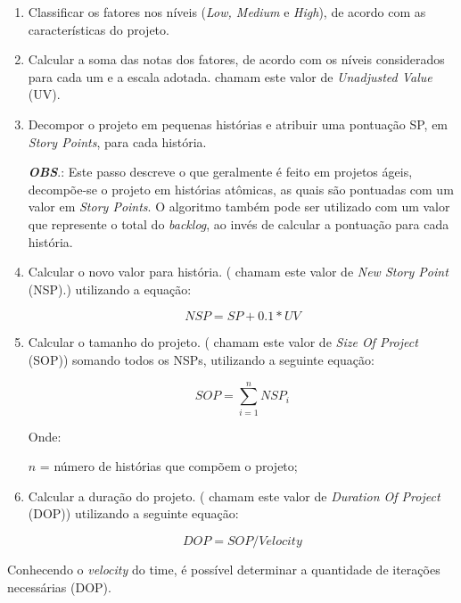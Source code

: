     \begin{enumerate}
     
     \item Classificar os fatores nos níveis (\textit{Low, Medium} e \textit{High}), de acordo com as características do projeto.
     
     \item Calcular a soma das notas dos fatores, de acordo com os níveis considerados para cada um e a escala adotada.
	    chamam este valor de \textit{Unadjusted Value} (UV).
	   
     \item Decompor o projeto em pequenas histórias e atribuir uma pontuação SP, em \textit{Story Points}, para cada história.
	
	\subitem \textbf{\textit{OBS}}.: Este passo descreve o que geralmente é feito em projetos ágeis, decompõe-se o projeto
		  em histórias atômicas, as quais são pontuadas com um valor em \textit{Story Points}.
		  O algoritmo também pode ser utilizado com um valor que represente o total do \textit{backlog}, ao invés de 
		  calcular a pontuação para cada história.
     
     \item Calcular o novo valor para história. 
	   ( chamam este valor de \textit{New Story Point} (NSP).) utilizando a equação:
     
	    $$ NSP = SP + 0.1*UV $$
	    
     \item Calcular o tamanho do projeto. ( chamam este valor de \textit{Size Of Project} (SOP))
	   somando todos os NSPs, utilizando a seguinte equação:
     
	    $$ SOP = \sum\limits_{i=1}^{n}NSP_i $$
	    
	    Onde:
	    
	    $n$ = número de histórias que compõem o projeto;
	    
     \item Calcular a duração do projeto. ( chamam este valor de \textit{Duration Of Project} (DOP))
	   utilizando a seguinte equação:
	   
	   $$ DOP = SOP/Velocity $$

    \end{enumerate}
    
    Conhecendo o \textit{velocity} do time, é possível determinar a quantidade de iterações necessárias (DOP).
    